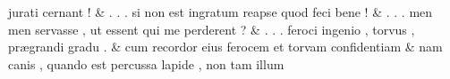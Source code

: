 \documentclass[12pt,onecolumn,twoside,a4paper]{memoir}
\begin{document}
\begin{pairs}
\begin{Leftside}
                              jurati
                              cernant
                              ! \&
                         \stanza {}
                     .
                              .
                              .
                              si
                              non
                              est
                              ingratum
                              reapse
                              quod
                              feci
                              bene
                              ! \&
                         \stanza {}
                     .
                              .
                              .
                              men
                              {men}
                              servasse
                              ,
                              ut
                              essent
                              qui
                              me
                              perderent
                              ? \&
                         \stanza {}
                     .
                              .
                              .
                              feroci
                              ingenio
                              ,
                              torvus
                              ,
                              prægrandi
                              gradu
                              . \&
                         \stanza {}
                     cum
                              recordor
                              eius
                              ferocem
                              et
                              torvam
                              confidentiam \&
                         \stanza {}nam
                              canis
                              ,
                              quando
                              est
                              percussa
                              lapide
                              ,
                              non
                              tam
                              illum

\end{Leftside}
\end{pairs}
\end{document}
